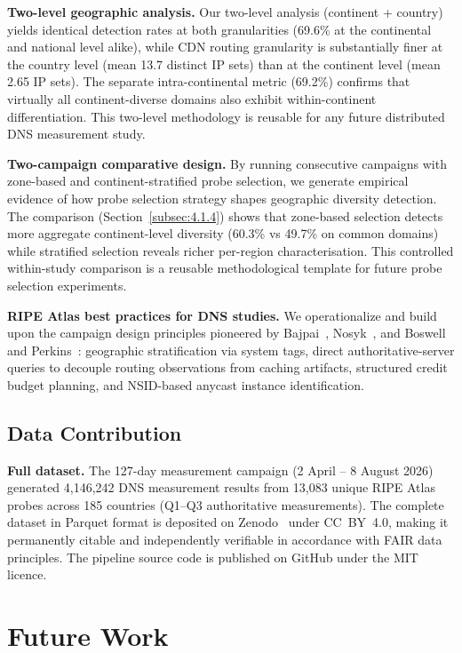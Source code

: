 \textbf{Two-level geographic analysis.} Our two-level analysis (continent + country) yields identical detection rates at both granularities (69.6\% at the continental and national level alike), while \ac{CDN} routing granularity is substantially finer at the country level (mean 13.7 distinct \ac{IP} sets) than at the continent level (mean 2.65 \ac{IP} sets). The separate intra-continental metric (69.2\%) confirms that virtually all continent-diverse domains also exhibit within-continent differentiation. This two-level methodology is reusable for any future distributed \ac{DNS} measurement study.

\textbf{Two-campaign comparative design.} By running consecutive campaigns with zone-based and continent-stratified probe selection, we generate empirical evidence of how probe selection strategy shapes geographic diversity detection. The comparison (Section~\ref{subsec:4.1.4}) shows that zone-based selection detects more aggregate continent-level diversity (60.3\% vs 49.7\% on common domains) while stratified selection reveals richer per-region characterisation. This controlled within-study comparison is a reusable methodological template for future probe selection experiments.

\textbf{RIPE Atlas best practices for \ac{DNS} studies.} We operationalize and build upon the campaign design principles pioneered by Bajpai~\cite{Bajpai2017}, Nosyk~\cite{Nosyk2025}, and Boswell and Perkins~\cite{Boswell2024}: geographic stratification via system tags, direct authoritative-server queries to decouple routing observations from caching artifacts, structured credit budget planning, and \ac{NSID}-based anycast instance identification.

\bigskip
\subsection{Data Contribution}
\label{subsec:5.3.3}

\textbf{Full dataset.} The 127-day measurement campaign (2 April -- 8 August 2026) generated 4,146,242 \ac{DNS} measurement results from 13,083 unique RIPE Atlas probes across 185 countries (Q1--Q3 authoritative measurements). The complete dataset in Parquet format is deposited on Zenodo~\cite{Zenodo} under CC~BY~4.0, making it permanently citable and independently verifiable in accordance with \ac{FAIR} data principles. The pipeline source code is published on GitHub under the MIT licence.

\bigskip
\section{Future Work}
\label{sec:5.4}

